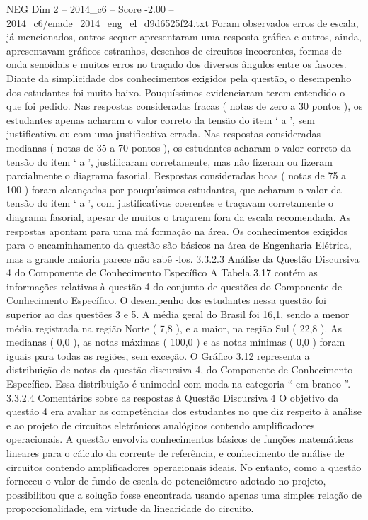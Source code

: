 \begin{textsample}{NEG Dim 2 – 2014\_c6 – Score -2.00 – 2014\_c6/enade\_2014\_eng\_el\_d9d6525f24.txt}
Foram observados erros de escala, já mencionados, outros sequer apresentaram uma resposta gráfica e outros, ainda, apresentavam gráficos estranhos, desenhos de circuitos incoerentes, formas de onda senoidais e muitos erros no traçado dos diversos ângulos entre os fasores.
Diante da simplicidade dos conhecimentos exigidos pela questão, o desempenho dos estudantes foi muito baixo.
Pouquíssimos evidenciaram terem entendido o que foi pedido.
Nas respostas consideradas fracas ( notas de zero a 30 pontos ), os estudantes apenas acharam o valor correto da tensão do item ‘ a ’, sem justificativa ou com uma justificativa errada.
Nas respostas consideradas medianas ( notas de 35 a 70 pontos ), os estudantes acharam o valor correto da tensão do item ‘ a ’, justificaram corretamente, mas não fizeram ou fizeram parcialmente o diagrama fasorial.
Respostas consideradas boas ( notas de 75 a 100 ) foram alcançadas por pouquíssimos estudantes, que acharam o valor da tensão do item ‘ a ’, com justificativas coerentes e traçavam corretamente o diagrama fasorial, apesar de muitos o traçarem fora da escala recomendada.
As respostas apontam para uma má formação na área.
Os conhecimentos exigidos para o encaminhamento da questão são básicos na área de Engenharia Elétrica, mas a grande maioria parece não sabê -los. 3.3.2.3 Análise da Questão Discursiva 4 do Componente de Conhecimento Específico A Tabela 3.17 contém as informações relativas à questão 4 do conjunto de questões do Componente de Conhecimento Específico.
O desempenho dos estudantes nessa questão foi superior ao das questões 3 e 5.
A média geral do Brasil foi 16,1, sendo a menor média registrada na região Norte ( 7,8 ), e a maior, na região Sul ( 22,8 ).
As medianas ( 0,0 ), as notas máximas ( 100,0 ) e as notas mínimas ( 0,0 ) foram iguais para todas as regiões, sem exceção.
O Gráfico 3.12 representa a distribuição de notas da questão discursiva 4, do Componente de Conhecimento Específico.
Essa distribuição é unimodal com moda na categoria “ em branco ”. 3.3.2.4 Comentários sobre as respostas à Questão Discursiva 4 O objetivo da questão 4 era avaliar as competências dos estudantes no que diz respeito à análise e ao projeto de circuitos eletrônicos analógicos contendo amplificadores operacionais.
A questão envolvia conhecimentos básicos de funções matemáticas lineares para o cálculo da corrente de referência, e conhecimento de análise de circuitos contendo amplificadores operacionais ideais.
No entanto, como a questão forneceu o valor de fundo de escala do potenciômetro adotado no projeto, possibilitou que a solução fosse encontrada usando apenas uma simples relação de proporcionalidade, em virtude da linearidade do circuito.

\end{textsample}
